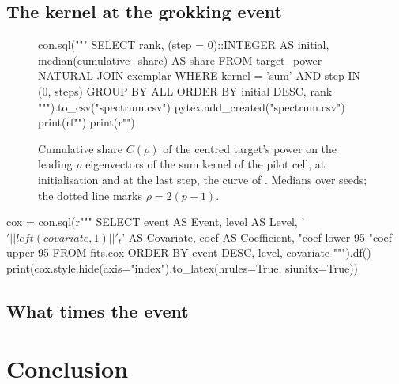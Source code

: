 \documentclass[a4paper,11pt]{article} %
\begin{document}
\FloatBarrier

\subsection{The kernel at the grokking event}\label{sec:event}

\begin{figure}[H]
  \centering
\begin{pycode}
con.sql("""
    SELECT rank, (step = 0)::INTEGER AS initial,
        median(cumulative_share) AS share
    FROM target_power NATURAL JOIN exemplar
    WHERE kernel = 'sum' AND step IN (0, steps)
    GROUP BY ALL
    ORDER BY initial DESC, rank
""").to_csv("spectrum.csv")
pytex.add_created("spectrum.csv")
print(rf"\def\leading{{{2 * (cell['p'] - 1)}}}")
print(r"")
\end{pycode}
  \caption{Cumulative share $C(\rho)$ of the centred target's power on the
    leading $\rho$ eigenvectors of the sum kernel of the pilot cell, at
    initialisation and at the last step, the curve of
    \citet[Eq.~6, Fig.~1e]{canatarSpectralBiasTaskModel2021}. Medians over
   seeds; the dotted line marks $\rho=2(p-1)$.}
  \label{fig:spectrum}
\end{figure}

\begin{table}[H]
  \centering
  \caption{Coefficients of the relative risk model with time-dependent
    covariates \citep[Eq.~6.14]{kalbfleischStatisticalAnalysisFailure2002} on
    $S_t$, $R_t$ and $A_t$ \eqref{eq:statistics}, with their
    \qty{95}{\percent} intervals
  and $p$-values.}
  \label{tab:cox}
\begin{pycode}
cox = con.sql(r"""
    SELECT event AS Event, level AS Level,
        '$' || left(covariate, 1) || '_t$' AS Covariate,
        coef AS Coefficient, "coef lower 95%
        "coef upper 95%
    FROM fits.cox
    ORDER BY event DESC, level, covariate
""").df()
print(cox.style.hide(axis="index").to_latex(hrules=True, siunitx=True))
\end{pycode}
\end{table}

\subsection{What times the event}\label{sec:clock}


\section{Conclusion}
\end{document}
